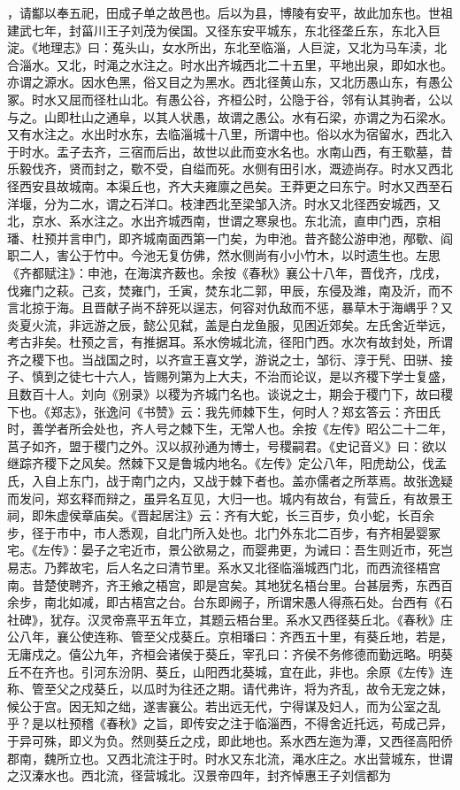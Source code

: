 \documentclass[12pt,UTF8]{ctexbook}
\begin{document}
，请酅以奉五祀，田成子单之故邑也。后以为县，博陵有安平，故此加东也。世祖建武七年，封菑川王子刘茂为侯国。又径东安平城东，东北径垄丘东，东北入巨淀。《地理志》曰：菟头山，女水所出，东北至临淄，人巨淀，又北为马车渎，北合淄水。又北，时渑之水注之。时水出齐城西北二十五里，平地出泉，即如水也。亦谓之源水。因水色黑，俗又目之为黑水。西北径黄山东，又北历愚山东，有愚公冢。时水又屈而径杜山北。有愚公谷，齐桓公时，公隐于谷，邻有认其驹者，公以与之。山即杜山之通阜，以其人状愚，故谓之愚公。水有石梁，亦谓之为石梁水。又有水注之。水出时水东，去临淄城十八里，所谓中也。俗以水为宿留水，西北入于时水。盂子去齐，三宿而后出，故世以此而变水名也。水南山西，有王歜墓，昔乐毅伐齐，贤而封之，歜不受，自缢而死。水侧有田引水，溉迹尚存。时水又西北径西安县故城南。本渠丘也，齐大夫雍廪之邑矣。王莽更之曰东宁。时水又西至石洋堰，分为二水，谓之石洋口。枝津西北至梁邹入济。时水又北径西安城西，又北，京水、系水注之。水出齐城西南，世谓之寒泉也。东北流，直申门西，京相璠、杜预并言申门，即齐城南面西第一门矣，为申池。昔齐懿公游申池，邴歜、阎职二人，害公于竹中。今池无复仿佛，然水侧尚有小小竹木，以时遗生也。左思《齐都赋注》：申池，在海滨齐薮也。余按《春秋》襄公十八年，晋伐齐，戊戌，伐雍门之萩。己亥，焚雍门，壬寅，焚东北二郭，甲辰，东侵及潍，南及沂，而不言北掠于海。且晋献子尚不辞死以逞志，何容对仇敌而不惩，暴草木于海嵎乎？又炎夏火流，非远游之辰，懿公见弑，盖是白龙鱼服，见困近郊矣。左氏舍近举远，考古非矣。杜预之言，有推据耳。系水傍城北流，径阳门西。水次有故封处，所谓齐之稷下也。当战国之时，以齐宣王喜文学，游说之士，邹衍、淳于髠、田骈、接子、慎到之徒七十六人，皆赐列第为上大夫，不治而论议，是以齐稷下学士复盛，且数百十人。刘向《别录》以稷为齐城门名也。谈说之士，期会于稷门下，故曰稷下也。《郑志》，张逸问《书赞》云：我先师棘下生，何时人？郑玄答云：齐田氏时，善学者所会处也，齐人号之棘下生，无常人也。余按《左传》昭公二十二年，莒子如齐，盟于稷门之外。汉以叔孙通为博士，号稷嗣君。《史记音义》曰：欲以继踪齐稷下之风矣。然棘下又是鲁城内地名。《左传》定公八年，阳虎劫公，伐孟氏，入自上东门，战于南门之内，又战于棘下者也。盖亦儒者之所萃焉。故张逸疑而发问，郑玄释而辩之，虽异名互见，大归一也。城内有故台，有营丘，有故景王祠，即朱虚侯章庙矣。《晋起居注》云：齐有大蛇，长三百步，负小蛇，长百余步，径于市中，市人悉观，自北门所入处也。北门外东北二百步，有齐相晏婴冢宅。《左传》：晏子之宅近市，景公欲易之，而婴弗更，为诫曰：吾生则近市，死岂易志。乃葬故宅，后人名之曰清节里。系水又北径临淄城西门北，而西流径梧宫南。昔楚使聘齐，齐王飨之梧宫，即是宫矣。其地犹名梧台里。台甚层秀，东西百余步，南北如减，即古梧宫之台。台东即阙子，所谓宋愚人得燕石处。台西有《石社碑》，犹存。汉灵帝熹平五年立，其题云梧台里。系水又西径葵丘北。《春秋》庄公八年，襄公使连称、管至父戍葵丘。京相璠曰：齐西五十里，有葵丘地，若是，无庸戍之。僖公九年，齐桓会诸侯于葵丘，宰孔曰：齐侯不务修德而勤远略。明葵丘不在齐也。引河东汾阴、葵丘，山阳西北葵城，宜在此，非也。余原《左传》连称、管至父之戍葵丘，以瓜时为往还之期。请代弗许，将为齐乱，故令无宠之妹，候公于宫。因无知之绌，遂害襄公。若出远无代，宁得谋及妇人，而为公室之乱乎？是以杜预稽《春秋》之旨，即传安之注于临淄西，不得舍近托远，苟成己异，于异可殊，即义为负。然则葵丘之戍，即此地也。系水西左迤为潭，又西径高阳侨郡南，魏所立也。又西北流注于时。时水又东北流，渑水庄之。水出营城东，世谓之汉溱水也。西北流，径营城北。汉景帝四年，封齐悼惠王子刘信都为
\end{document}
